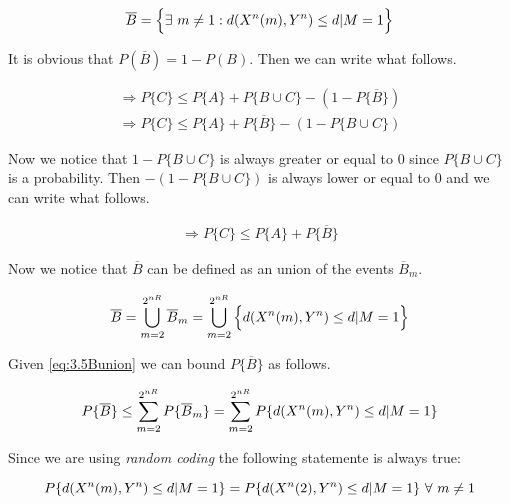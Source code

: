\begin{align*}
	\overline{B} = \Big \{ \exists \  m \neq 1 : d(X^n(m),Y^n) \leq d | M = 1 \Big \}
\end{align*}

 It is obvious that $P(\overline{B})=1-P(B)$. Then we can write what follows.

 \begin{equation}
 	\begin{gathered}
		\Rightarrow P \{ C \} \leq P \{ A \} + P \{ B \cup C \} -(1-P\{\overline{B} \})  \\
		\Rightarrow P \{ C \} \leq P \{ A \} + P\{\overline{B} \}-(1-P \{ B \cup C \} )
 	\end{gathered}
 \end{equation}

Now we notice that $1-P \{ B \cup C \}$ is always greater or equal to $0$ since $P \{ B \cup C \}$ is a probability. Then $-(1-P \{ B \cup C \})$ is always lower or equal to $0$ and we can write what follows.

\begin{equation}
 \begin{gathered}
	 \Rightarrow P \{ C \} \leq P \{ A \} + P\{\overline{B} \}
 \end{gathered}
\label{eq:3.5diseq}
\end{equation}

Now we notice that $\overline{B}$ can be defined as an union of the events $\overline{B}_m$.

\begin{equation}
		\overline{B} = \bigcup _{m=2}^{2^{nR}} \overline{B}_m = \bigcup _{m=2}^{2^{nR}} \Big \{ d(X^n(m),Y^n) \leq d | M = 1\Big \}
		\label{eq:3.5Bunion}
\end{equation}

Given \eqref{eq:3.5Bunion} we can bound $P\{ \overline{B}\}$ as follows.

\begin{equation}
	P\{\overline{B} \} \leq \sum_{m=2}^{2^{nR}} P \{ \overline{B}_m \} = \sum_{m=2}^{2^{nR}} P \{ d(X^n(m),Y^n) \leq d | M = 1 \}
	\label{eq:3.5Bsum}
\end{equation}

Since we are using \textit{random coding} the following statemente is always true:

\begin{equation}
	P \{ d(X^n(m),Y^n) \leq d | M = 1 \} = P \{ d(X^n(2),Y^n) \leq d | M = 1  \} \ \forall \ m \neq 1
\end{equation}

